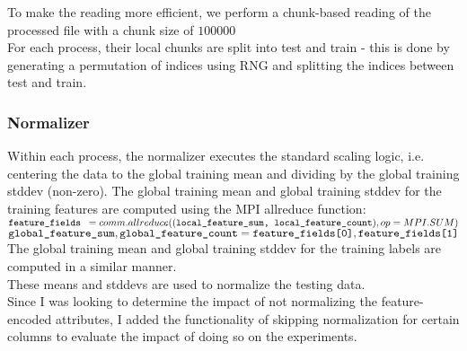 \documentclass{article}
\begin{document}
To make the reading more efficient, we perform a chunk-based reading of the processed file with a chunk size of $100000$ \\
 
For each process, their local chunks are split into test and train - this is done by generating a permutation of indices using RNG and splitting the indices between test and train.

\subsubsection{Normalizer}
Within each process, the normalizer executes the standard scaling logic, i.e. centering the data to the global training mean and dividing by the global training stddev (non-zero).
The global training mean and global training stddev for the training features are computed using the MPI allreduce function:\\

$\verb|feature_fields |= comm.allreduce((\verb|local_feature_sum, local_feature_count|), op=MPI.SUM)$ \\
$\verb|global_feature_sum|, \verb|global_feature_count| = \verb|feature_fields[0]|, \verb|feature_fields[1]|$ \\

The global training mean and global training stddev for the training labels are computed in a similar manner. \\

These means and stddevs are used to normalize the testing data. \\

Since I was looking to determine the impact of not normalizing the feature-encoded attributes, I added the functionality of skipping normalization for certain columns to evaluate the impact of doing so on the experiments. \\
\end{document}
